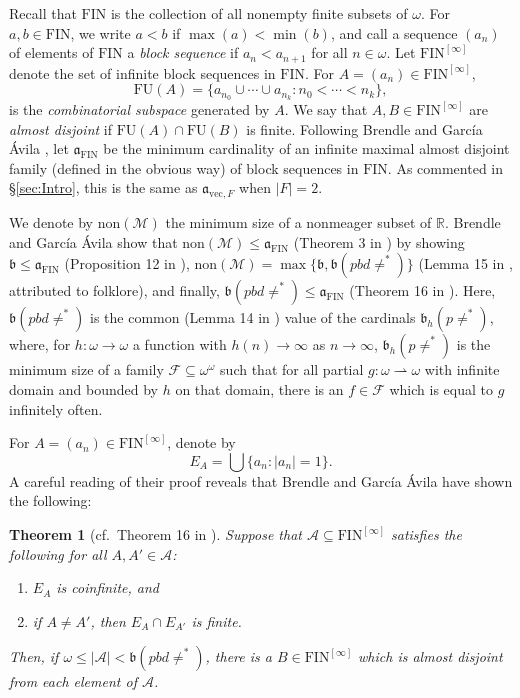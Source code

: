 \documentclass[11pt]{amsart}
\newcommand{\R}{\mathbb{R}}
\newcommand{\LM}{\mathcal{M}}
\newcommand{\LF}{\mathcal{F}}
\newcommand{\LA}{\mathcal{A}}
\renewcommand{\b}{\mathfrak{b}}
\renewcommand{\a}{\mathfrak{a}}
\newtheorem{thm}{Theorem}[section]
\theoremstyle{definition}
\theoremstyle{remark}
\renewcommand{\1}{\mathbf{1}}
\newcommand{\FIN}{\mathrm{FIN}}
\newcommand{\FU}{\mathrm{FU}}
\begin{document}
Recall that $\FIN$ is the collection of all nonempty finite subsets of $\omega$. For $a,b\in\FIN$, we write $a<b$ if $\max(a)<\min(b)$, and call a sequence $(a_n)$ of elements of $\FIN$ a \emph{block sequence} if $a_n<a_{n+1}$ for all $n\in\omega$. Let $\FIN^{[\infty]}$ denote the set of infinite block sequences in $\FIN$. For $A=(a_n)\in\FIN^{[\infty]}$,
	\[
		\FU(A)=\{a_{n_0}\cup\cdots\cup a_{n_k}:n_0<\cdots<n_k\},
	\] 
	is the \emph{combinatorial subspace} generated by $A$. We say that $A,B\in\FIN^{[\infty]}$ are \emph{almost disjoint} if $\FU(A)\cap\FU(B)$ is finite. Following Brendle and Garc\'ia \'Avila \cite{MR3685044}, let $\a_{\FIN}$ be the minimum cardinality of an infinite maximal almost disjoint family (defined in the obvious way) of block sequences in $\FIN$. As commented in \S\ref{sec:Intro}, this is the same as $\a_{\mathrm{vec},F}$ when $|F|=2$.

We denote by $\mathrm{non}(\LM)$ the minimum size of a nonmeager subset of $\R$. Brendle and Garc\'ia \'Avila show that $\mathrm{non}(\LM)\leq\a_{\FIN}$ (Theorem 3 in \cite{MR3685044}) by showing $\b\leq\a_{\FIN}$ (Proposition 12 in \cite{MR3685044}), $\mathrm{non}(\LM)=\max\{\b,\b(pbd\neq^*)\}$ (Lemma 15 in \cite{MR3685044}, attributed to folklore), and finally, $\b(pbd\neq^*)\leq\a_{\FIN}$ (Theorem 16 in \cite{MR3685044}). Here, $\b(pbd\neq^*)$ is the common (Lemma 14 in \cite{MR3685044}) value of the cardinals $\b_h(p\neq^*)$, where, for $h:\omega\to\omega$ a function with $h(n)\to\infty$ as $n\to\infty$, $\b_h(p\neq^*)$ is the minimum size of a family $\LF\subseteq\omega^\omega$ such that for all partial $g:\omega\rightharpoonup\omega$ with infinite domain and bounded by $h$ on that domain, there is an  $f\in \LF$ which is equal to $g$ infinitely often.

For $A=(a_n)\in\FIN^{[\infty]}$, denote by
\[
	E_A=\bigcup\{a_n:|a_n|=1\}.
\]
A careful reading of their proof reveals that Brendle and Garc\'ia \'Avila have shown the following:

\begin{thm}[cf.~Theorem 16 in \cite{MR3685044}]\label{thm:B-GA}
	Suppose that $\LA\subseteq\FIN^{[\infty]}$ satisfies the following for all $A,A'\in\LA$:
	\begin{enumerate}[label=\textup{(\roman*)}]
		\item $E_A$ is coinfinite, and
		\item if $A\neq A'$, then $E_A\cap E_{A'}$ is finite.
	\end{enumerate}
	Then, if $\omega\leq|\LA|<\b(pbd\neq^*)$, there is a $B\in\FIN^{[\infty]}$ which is almost disjoint from each element of $\LA$.
\end{thm}
\end{document}
